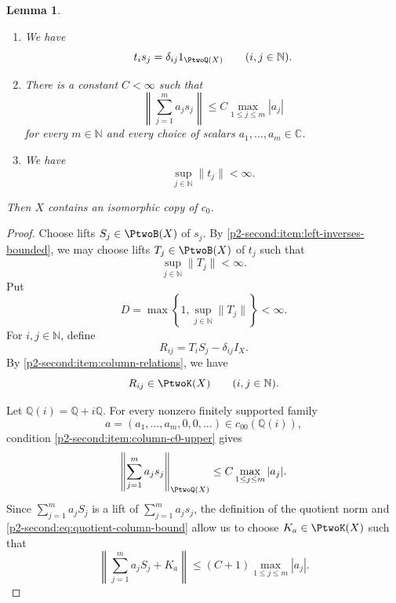 \documentclass[11pt,reqno]{amsart}
\makeatletter
\theoremstyle{plain}
\newtheorem{lemma}[lemma]{Lemma}
\theoremstyle{definition}
\newcommand{\N}{\mathbb N}
\newcommand{\C}{\mathbb C}
\newcounter{problempaper}
\newenvironment{problempaperbody}{%
  \setcounter{subsection}{0}%
  \setcounter{subsubsection}{0}%
  \setcounter{paragraph}{0}%
  \renewcommand{\thesubsection}{\arabic{subsection}}%
  \renewcommand{\thesubsubsection}{\thesubsection.\arabic{subsubsection}}%
  \renewcommand{\theparagraph}{\thesubsubsection.\arabic{paragraph}}%
  \let\problem@outersection\section
  \let\problem@outersubsection\subsection
  \let\problem@outersubsubsection\subsubsection
  \let\problem@outerparagraph\paragraph
  \let\section\problem@papersection
  \let\subsection\problem@papersubsection
  \let\subsubsection\problem@papersubsubsection
}{%
  \let\section\problem@outersection
  \let\subsection\problem@outersubsection
  \let\subsubsection\problem@outersubsubsection
  \let\paragraph\problem@outerparagraph
}
\newcommand{\problem@target}[2]{%
  \hypertarget{problem-\theproblempaper-#1-#2}{}%
}
\newcommand{\problem@paperheading}[3]{%
  \par\bigskip
  \problem@target{#1}{#2}%
  \noindent{\large\bfseries #2.\quad #3\par}%
  \nobreak\smallskip
}
\newcommand{\problem@papersubheading}[3]{%
  \par\medskip
  \problem@target{#1}{#2}%
  \noindent{\normalsize\bfseries #2.\quad #3\par}%
  \nobreak\smallskip
}
\newcommand{\problem@papersubsubheading}[3]{%
  \par\smallskip
  \problem@target{#1}{#2}%
  \noindent{\normalsize\itshape #2.\quad #3.\ }%
}
\def\problem@papersection{%
  \@ifstar{\problem@papersectionstar}{\problem@papersectionnostar}%
}
\def\problem@papersectionstar#1{%
  \par\bigskip\noindent{\large\bfseries #1\par}\nobreak\smallskip
}
\def\problem@papersectionnostar#1{%
  \refstepcounter{subsection}%
  \setcounter{subsubsection}{0}%
  \setcounter{paragraph}{0}%
  \problem@paperheading{section}{\thesubsection}{#1}%
  \problem@writecontentsline{section}{\thesubsection}{#1}%
}
\def\problem@papersubsection{%
  \@ifstar{\problem@papersubsectionstar}{\problem@papersubsectionnostar}%
}
\def\problem@papersubsectionstar#1{%
  \par\medskip\noindent{\normalsize\bfseries #1\par}\nobreak\smallskip
}
\def\problem@papersubsectionnostar#1{%
  \refstepcounter{subsubsection}%
  \setcounter{paragraph}{0}%
  \problem@papersubheading{subsection}{\thesubsubsection}{#1}%
  \problem@writecontentsline{subsection}{\thesubsubsection}{#1}%
}
\def\problem@papersubsubsection{%
  \@ifstar{\problem@papersubsubsectionstar}{\problem@papersubsubsectionnostar}%
}
\def\problem@papersubsubsectionstar#1{%
  \par\smallskip\noindent{\normalsize\itshape #1.\ }%
}
\def\problem@papersubsubsectionnostar#1{%
  \refstepcounter{paragraph}%
  \problem@papersubsubheading{subsubsection}{\theparagraph}{#1}%
  \problem@writecontentsline{subsubsection}{\theparagraph}{#1}%
}
\newcommand{\problem@writecontentsline}[3]{%
  \begingroup
  \protected@write\@auxout{}{%
    \string\problemcontentsentry{\theproblempaper}{#1}{#2}{#3}{\thepage}%
  }%
  \endgroup
}
\newcommand{\problemcontentsentry}[5]{%
  \@ifundefined{problemcontents@#1}{%
    \expandafter\gdef\csname problemcontents@#1\endcsname{}%
  }{}%
  \expandafter\g@addto@macro\csname problemcontents@#1\endcsname{%
    \problemcontentsline{#1}{#2}{#3}{#4}{#5}%
  }%
}
\newcommand{\problemcontentslink}[4]{%
  \hyperlink{problem-#1-#2-#3}{#4}%
}
\newcommand{\problemcontentsline}[5]{%
  \ifstrequal{#2}{section}{%
    \par\noindent
    \problemcontentslink{#1}{#2}{#3}{\makebox[2.5em][l]{#3}#4}%
    \nobreak\dotfill
    \problemcontentslink{#1}{#2}{#3}{#5}\par
  }{%
    \ifstrequal{#2}{subsection}{%
      \par\noindent\hspace*{1.5em}%
      \problemcontentslink{#1}{#2}{#3}{\makebox[3.5em][l]{#3}#4}%
      \nobreak\dotfill
      \problemcontentslink{#1}{#2}{#3}{#5}\par
    }{%
      \par\noindent\hspace*{3em}%
      \problemcontentslink{#1}{#2}{#3}{\makebox[4.5em][l]{#3}#4}%
      \nobreak\dotfill
      \problemcontentslink{#1}{#2}{#3}{#5}\par
    }%
  }%
}
\makeatother
\begin{document}
\begin{problempaperbody}
\begin{lemma}
\begin{enumerate}[label=\textup{(\roman*)}]
\item\label{p2-second:item:column-relations} We have
\begin{equation*}
        t_is_j=\delta_{ij}1_{\PtwoQ(X)} \qquad(i,j\in\N).
\end{equation*}

\item\label{p2-second:item:column-c0-upper} There is a constant $C<\infty$ such that
\begin{equation*}
        \left\|\sum_{j=1}^{m}a_js_j\right\|\leq C\max_{1\leq j\leq m}|a_j|
\end{equation*}
for every $m\in\N$ and every choice of scalars $a_1,\ldots,a_m\in\C$.

\item\label{p2-second:item:left-inverses-bounded} We have
\begin{equation*}
        \sup_{j\in\N}\|t_j\|<\infty.
\end{equation*}
\end{enumerate}

Then $X$ contains an isomorphic copy of $c_0$.
\end{lemma}

\begin{proof}
Choose lifts $S_j\in\PtwoB(X)$ of $s_j$. By \ref{p2-second:item:left-inverses-bounded}, we may choose lifts $T_j\in\PtwoB(X)$ of $t_j$ such that
\begin{equation*}
        \sup_{j\in\N}\|T_j\|<\infty.
\end{equation*}
Put
\begin{equation*}
        D=\max\left\{1,\sup_{j\in\N}\|T_j\|\right\}<\infty.
\end{equation*}
For $i,j\in\N$, define
\begin{equation*}
        R_{ij}=T_iS_j-\delta_{ij}I_X.
\end{equation*}
By \ref{p2-second:item:column-relations}, we have
\begin{equation*}
        R_{ij}\in\PtwoK(X) \qquad(i,j\in\N).
\end{equation*}

Let $\mathbb Q(i)=\mathbb Q+i\mathbb Q$. For every nonzero finitely supported family
\begin{equation*}
        a=(a_1,\ldots,a_m,0,0,\ldots)\in c_{00}(\mathbb Q(i)),
\end{equation*}
condition \ref{p2-second:item:column-c0-upper} gives
\begin{equation}
\label{p2-second:eq:quotient-column-bound}
        \left\|\sum_{j=1}^{m}a_js_j\right\|_{\PtwoQ(X)}
        \leq C\max_{1\leq j\leq m}|a_j|.
\end{equation}
Since $\sum_{j=1}^{m}a_jS_j$ is a lift of $\sum_{j=1}^{m}a_js_j$, the definition of the quotient norm and \eqref{p2-second:eq:quotient-column-bound} allow us to choose $K_a\in\PtwoK(X)$ such that
\begin{equation}
\label{p2-second:eq:Ka-choice}
        \left\|\sum_{j=1}^{m}a_jS_j+K_a\right\|
        \leq (C+1)\max_{1\leq j\leq m}|a_j|.
\end{equation}


\end{proof}
\end{problempaperbody}
\end{document}
